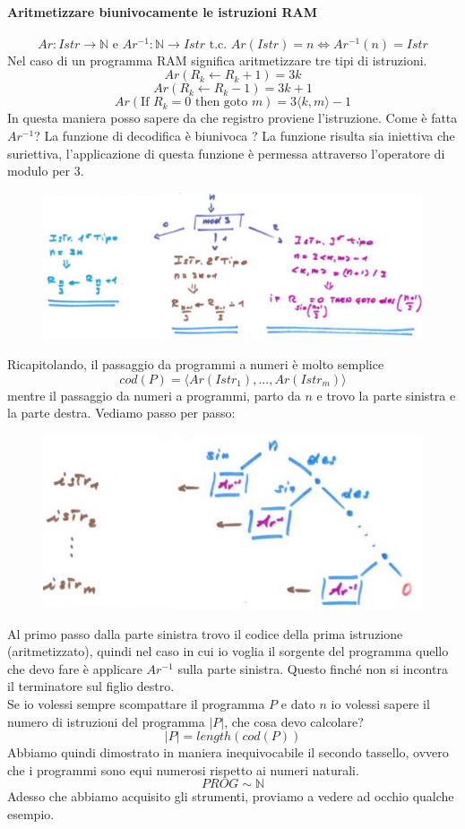 \documentclass{article}
\begin{document}
\paragraph{Aritmetizzare biunivocamente le istruzioni RAM}
$$Ar:Istr\rightarrow\mathbb{N}\text{ e }Ar^{-1}:\mathbb{N}\rightarrow Istr\text{ t.c. }
    Ar(Istr)=n\Leftrightarrow Ar^{-1}(n)=Istr$$
Nel caso di un programma RAM significa aritmetizzare tre tipi di istruzioni.
$$Ar(R_k\leftarrow R_k+1)=3k$$
$$Ar(R_k\leftarrow R_k-1)=3k+1$$
$$Ar(\text{If }R_k=0\text{ then goto }m)=3\langle k,m\rangle-1$$
In questa maniera posso sapere da che registro proviene l'istruzione.
Come è fatta $Ar^{-1}$? La funzione di decodifica è biunivoca ? La funzione
risulta sia iniettiva che suriettiva, l'applicazione di questa funzione è permessa
attraverso l'operatore di modulo per $3$.
\begin{figure}[H]
    \centering
    \includegraphics[scale=0.4]{images/mod3.png}
\end{figure}
Ricapitolando, il passaggio da programmi a numeri è molto semplice
$$cod(P)=\langle Ar(Istr_1),...,Ar(Istr_m)\rangle$$
mentre il passaggio da numeri a programmi, parto da $n$ e trovo la parte sinistra e
la parte destra. Vediamo passo per passo:
\begin{figure}[H]
    \centering
    \includegraphics[scale=0.5]{images/decod_bin.png}
\end{figure}
Al primo passo dalla parte sinistra trovo il codice della prima istruzione
(aritmetizzato), quindi nel caso in cui io voglia il sorgente del programma
quello che devo fare è applicare $Ar^{-1}$ sulla parte sinistra. Questo finché
non si incontra il terminatore sul figlio destro.\\Se io volessi sempre
scompattare il programma $P$ e dato $n$ io volessi sapere il numero di istruzioni
del programma $|P|$, che cosa devo calcolare?
$$|P|=length(cod(P))$$
Abbiamo quindi dimostrato in maniera inequivocabile il secondo tassello, ovvero
che i programmi sono equi numerosi rispetto ai numeri naturali.
$$PROG\sim\mathbb{N}$$
Adesso che abbiamo acquisito gli strumenti, proviamo a vedere ad occhio qualche
esempio.
\end{document}
